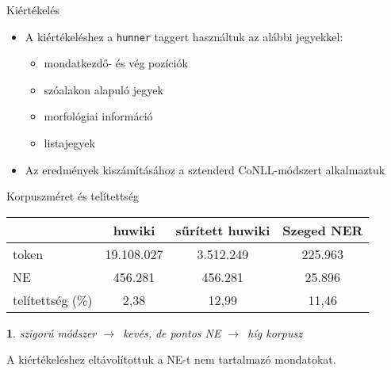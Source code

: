 \documentclass[utf8x,t]{beamer}
\newcommand{\vitem}{\item \vspace{4pt}}
\newcommand{\nyil}{$\rightarrow$\ }
\newtheorem{nix}{}[section]
\begin{document}

\begin{frame}{Kiértékelés}

\bigskip

\begin{itemize}
\item A kiértékeléshez a \texttt{hunner} taggert használtuk az alábbi jegyekkel:
\begin{itemize}
\vitem mondatkezdő- és vég pozíciók
\vitem szóalakon alapuló jegyek
\vitem morfológiai információ
\vitem listajegyek
\end{itemize}
\item Az eredmények kiszámításához a sztenderd CoNLL-módszert alkalmaztuk
\end{itemize}

\bigskip

\end{frame}

\begin{frame}{Korpuszméret és telítettség}

\bigskip

\begin{tabular}{lccc}
\toprule
 & \textbf{huwiki} & \textbf{sűrített huwiki} & \textbf{Szeged NER} \\
\midrule
token & 19.108.027 & 3.512.249  & 225.963 \\
NE & 456.281 & 456.281  & 25.896 \\
telítettség (\%) & 2,38 & 12,99 & 11,46 \\
\bottomrule
\end{tabular}

\bigskip

\begin{nix}
szigorú módszer \nyil kevés, de pontos NE \nyil híg korpusz
\end{nix}

\bigskip

A kiértékeléshez eltávolítottuk a NE-t nem tartalmazó mondatokat.

\end{frame}
\end{document}
